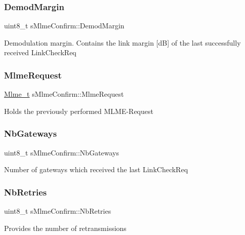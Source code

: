 \subsubsection{\texorpdfstring{Demod\+Margin}{DemodMargin}}
{\footnotesize\ttfamily uint8\+\_\+t s\+Mlme\+Confirm\+::\+Demod\+Margin}

Demodulation margin. Contains the link margin \mbox{[}dB\mbox{]} of the last successfully received Link\+Check\+Req \mbox{\label{structsMlmeConfirm_a4d4f24a72592be1fbfd21d7179256088}} 
\subsubsection{\texorpdfstring{Mlme\+Request}{MlmeRequest}}
{\footnotesize\ttfamily \hyperlink{group__LORAMAC_ga663544b83d50ec3518608be495896809}{Mlme\+\_\+t} s\+Mlme\+Confirm\+::\+Mlme\+Request}

Holds the previously performed M\+L\+M\+E-\/\+Request \mbox{\label{structsMlmeConfirm_a030224406f25b8eec68e91952087a44e}} 
\subsubsection{\texorpdfstring{Nb\+Gateways}{NbGateways}}
{\footnotesize\ttfamily uint8\+\_\+t s\+Mlme\+Confirm\+::\+Nb\+Gateways}

Number of gateways which received the last Link\+Check\+Req \mbox{\label{structsMlmeConfirm_a2c539bfc04286bb8f338085d8c8438dc}} 
\subsubsection{\texorpdfstring{Nb\+Retries}{NbRetries}}
{\footnotesize\ttfamily uint8\+\_\+t s\+Mlme\+Confirm\+::\+Nb\+Retries}

Provides the number of retransmissions \mbox{\label{structsMlmeConfirm_adb06d9fb17164ca72847bbdb9238800f}} 
